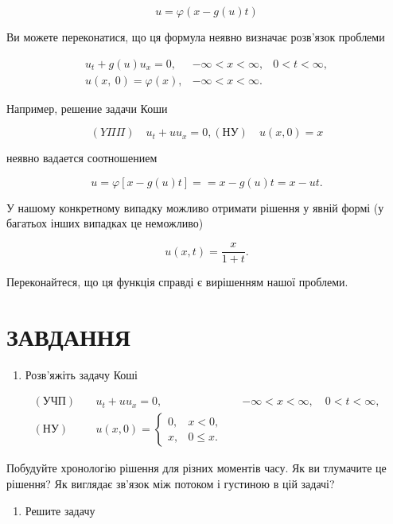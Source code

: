 \documentclass[
  ukrainian,
]{article}
\providecommand{\tightlist}{%
  \setlength{\itemsep}{0pt}\setlength{\parskip}{0pt}}
\begin{document}
\[
u = \varphi(x - g(u) t)
\]

Ви можете переконатися, що ця формула неявно визначає розв'язок проблеми

\[
\begin{array}{llll} u_t + g\left(u\right) u_x = 0, & -\infty < x < \infty, & 0 < t < \infty, \\ u\left(x, \ 0\right) = \varphi\left(x\right), & -\infty < x < \infty. \end{array}
\]

Например, решение задачи Коши

\[
(Y\Pi\Pi) \quad u_t + uu_x = 0,
(\text{НУ}) \quad u(x, 0) = x
\]

неявно вадается соотношением

\[
u = \varphi [x - g(u) t] =
= x - g(u) t = x - ut.
\]

У нашому конкретному випадку можливо отримати рішення у явній формі (у
багатьох інших випадках це неможливо)

\[
u(x, t) = \frac{x}{1+t}.
\]

Переконайтеся, що ця функція справді є вирішенням нашої проблеми.

\section{\texorpdfstring{\textbf{ЗАВДАННЯ}}{ЗАВДАННЯ}}\label{ux437ux430ux432ux434ux430ux43dux43dux44f}

\begin{enumerate}
\def\labelenumi{\arabic{enumi}.}
\tightlist
\item
  Розв'яжіть задачу Коші
\end{enumerate}

\[
\begin{aligned}
(\text{УЧП})\quad & u_t + uu_x = 0, && -\infty < x < \infty,\quad 0 < t < \infty, \\
(\text{НУ})\quad & u(x,0) =
\begin{cases}
0, & x < 0, \\
x, & 0 \leqslant x.
\end{cases}
\end{aligned}
\]

Побудуйте хронологію рішення для різних моментів часу. Як ви тлумачите
це рішення? Як виглядає зв'язок між потоком і густиною в цій задачі?

\begin{enumerate}
\def\labelenumi{\arabic{enumi}.}
\setcounter{enumi}{1}
\tightlist
\item
  Решите задачу
\end{enumerate}
\end{document}

